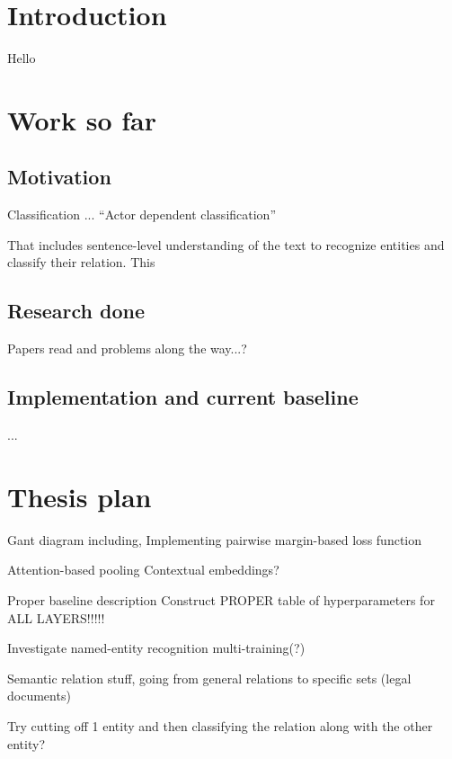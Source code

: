 \documentclass{article}
\begin{document}
\section{Introduction}
 
Hello


\section{Work so far}

\subsection{Motivation}

Classification ... ``Actor dependent classification''

That includes sentence-level understanding of the text to recognize entities and classify their relation. This 

\subsection{Research done}

Papers read and problems along the way...?


\subsection{Implementation and current baseline}

...

\section{Thesis plan}


Gant diagram including,
Implementing pairwise margin-based loss function

Attention-based pooling
Contextual embeddings?

Proper baseline description
Construct PROPER table of hyperparameters for ALL LAYERS!!!!!

Investigate named-entity recognition multi-training(?)

Semantic relation stuff, going from general relations to specific
sets (legal documents)

Try cutting off 1 entity and then classifying the relation along with the other entity?




    
\end{document}
